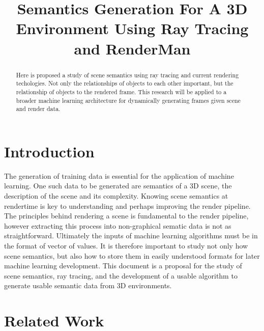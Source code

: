\documentclass[conference]{IEEEtran}
\begin{document}
\title{Semantics Generation For A 3D Environment Using Ray Tracing and RenderMan}

\author{
}

\maketitle

\begin{abstract}
Here is proposed a study of scene semantics
using ray tracing and current rendering techologies.
Not only the relationships of objects to each other important,
but the relationship of objects to the rendered frame.
This research will be applied to a broader machine learning
architecture for dynamically generating frames
given scene and render data.
\end{abstract}

\section{Introduction}
\label{sec:introduction}
The generation of training data is essential
for the application of machine learning.
One such data to be generated are semantics of a 3D scene,
the description of the scene and its complexity.
Knowing scene semantics at rendertime is key to understanding and perhaps improving the render
pipeline.
The principles behind rendering a scene is fundamental to the
render pipeline, however
extracting this process into non-graphical sematic data is not as straightforward.
Ultimately the inputs of machine learning algorithms must be in the format of vector of values.
It is therefore important to study not only how scene semantics,
but also how to store them in easily understood formats for later machine learning development.
This document is a proposal for the study of scene semantics, ray tracing, and the development of a
usable algorithm to generate usable semantic data from 3D environments.

\section{Related Work}
\label{sec:related_work}
\end{document}
